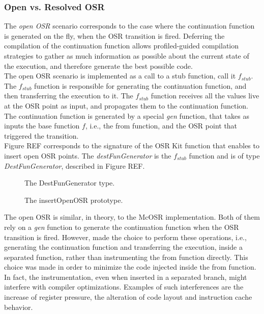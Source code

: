\subsubsection{Open vs. Resolved OSR}

The \textit{open OSR} scenario corresponds to the case where the continuation function is generated on the fly, when the OSR transition is fired.
Deferring the compilation of the continuation function allows profiled-guided compilation strategies to gather as much information as possible about the current state of the execution, and therefore generate the best possible code.\\

The open OSR scenario is implemented as a call to a stub function, call it $f_{stub}$.
The $f_{stub}$ function is responsible for generating the continuation function, and then transferring the execution to it.
The $f_{stub}$ function receives all the values live at the OSR point as input, and propagates them to the continuation function.
The continuation function is generated by a special \textit{gen} function, that takes as inputs the base function $f$, i.e., the from function, and the OSR point that triggered the transition.\\

Figure REF corresponds to the signature of the OSR Kit function that enables to insert open OSR points.
The \textit{destFunGenerator} is the $f_{stub}$ function and is of type \textit{DestFunGenerator}, described in Figure REF.\\

\begin{figure}[h]
\caption{The DestFunGenerator type.}
\label{fig:destfungenerator}
\end{figure}

\begin{figure}[h]
\caption{The insertOpenOSR prototype.}
\label{fig:insertopenosr}
\end{figure}

The open OSR is similar, in theory, to the McOSR implementation\cite{lameed2013modular}.
Both of them rely on a \textit{gen} function to generate the continuation function when the OSR transition is fired.
However,  made the choice to perform these operations, i.e., generating the continuation function and transferring the execution, inside a separated function, rather than instrumenting the from function directly.
This choice was made in order to minimize the code injected inside the from function.
In fact, the instrumentation, even when inserted in a separated branch, might interfere with compiler optimizations.
Examples of such interferences are the increase of register pressure, the alteration of code layout and instruction cache behavior.\\

